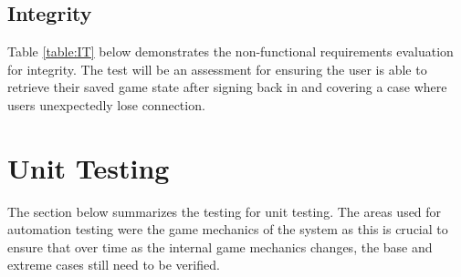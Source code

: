 \documentclass[12pt, titlepage]{article}
\begin{document}
\subsection{Integrity}
Table \ref{table:IT}  below demonstrates the non-functional requirements evaluation for integrity. The test will be an assessment for ensuring the user is able to retrieve their saved game state after signing back in and covering a case where users unexpectedly lose connection.
\begin{table}[H]
\caption{\bf Non-Functional Requirements Evaluation Results for Integrity\\}
\label{table:IT}
\end{table}


\section{Unit Testing}
The section below summarizes the testing for unit testing. The areas used for automation testing were the game mechanics of the system as this is crucial to ensure that over time as the internal game mechanics changes, the base and extreme cases still need to be verified.
\end{document}
